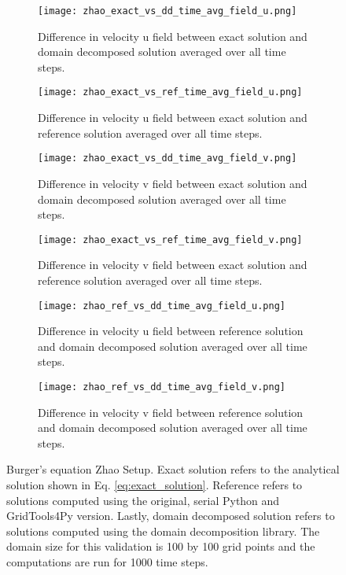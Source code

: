 \begin{figure}[!htbp]
\centering
\begin{subfigure}{0.45\textwidth}
  \centering
  \texttt{[image: zhao\_exact\_vs\_dd\_time\_avg\_field\_u.png]}
  \caption{Difference in velocity u field between exact solution and domain decomposed solution averaged over all time steps.}
  \label{fig:burgers_val1}
\end{subfigure} \hfill
\begin{subfigure}{0.45\textwidth}
  \centering
  \texttt{[image: zhao\_exact\_vs\_ref\_time\_avg\_field\_u.png]}
  \caption{Difference in velocity u field between exact solution and reference solution averaged over all time steps.}
  \label{fig:burgers_val2}
\end{subfigure}

\begin{subfigure}{0.45\textwidth}
  \centering
  \texttt{[image: zhao\_exact\_vs\_dd\_time\_avg\_field\_v.png]}
  \caption{Difference in velocity v field between exact solution and domain decomposed solution averaged over all time steps.}
  \label{fig:burgers_val3}
\end{subfigure} \hfill
\begin{subfigure}{0.45\textwidth}
  \centering
  \texttt{[image: zhao\_exact\_vs\_ref\_time\_avg\_field\_v.png]}
  \caption{Difference in velocity v field between exact solution and reference solution averaged over all time steps.}
  \label{fig:burgers_val4}
\end{subfigure}

\begin{subfigure}{0.45\textwidth}
  \centering
  \texttt{[image: zhao\_ref\_vs\_dd\_time\_avg\_field\_u.png]}
  \caption{Difference in velocity u field between reference solution and domain decomposed solution averaged over all time steps.}
  \label{fig:burgers_val5}
\end{subfigure} \hfill
\begin{subfigure}{0.45\textwidth}
  \centering
  \texttt{[image: zhao\_ref\_vs\_dd\_time\_avg\_field\_v.png]}
  \caption{Difference in velocity v field between reference solution and domain decomposed solution averaged over all time steps.}
  \label{fig:burgers_val6}
\end{subfigure}
\caption{Burger's equation Zhao Setup. 
Exact solution refers to the analytical solution shown in Eq. \ref{eq:exact_solution}.
Reference refers to solutions computed using the original, serial Python and GridTools4Py version.
Lastly, domain decomposed solution refers to solutions computed using the domain decomposition library.
The domain size for this validation is 100 by 100 grid points and the computations are run for 1000 time steps.
}
\end{figure}

